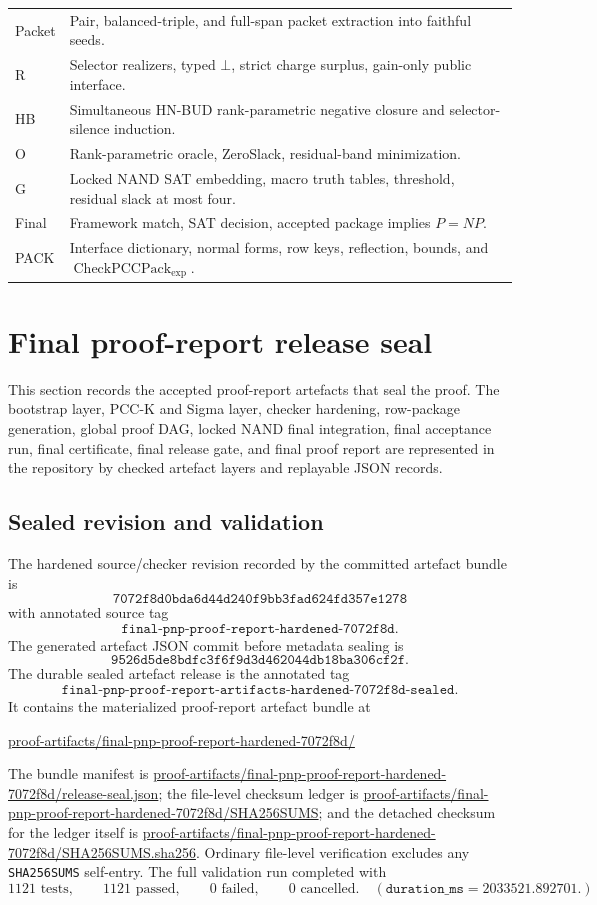 \documentclass[10.5pt,a4paper]{article}
\newcommand{\CheckPack}{\operatorname{CheckPCCPack}_{\exp}}
\newcommand{\Bot}{\bot}
\begin{document}
\begin{longtable}{>{\raggedright\arraybackslash}p{}p{}}
Packet & Pair, balanced-triple, and full-span packet extraction into faithful seeds.\\
R & Selector realizers, typed \(\Bot\), strict charge surplus, gain-only public interface.\\
HB & Simultaneous HN-BUD rank-parametric negative closure and selector-silence induction.\\
O & Rank-parametric oracle, ZeroSlack, residual-band minimization.\\
G & Locked NAND SAT embedding, macro truth tables, threshold, residual slack at most four.\\
Final & Framework match, SAT decision, accepted package implies \(P=NP\).\\
PACK & Interface dictionary, normal forms, row keys, reflection, bounds, and \(\CheckPack\).\\
\bottomrule
\end{longtable}


\section{Final proof-report release seal}\label{sec:final-proof-report}

This section records the accepted proof-report artefacts that seal the proof.  The bootstrap layer, PCC-K and Sigma layer, checker hardening, row-package generation, global proof DAG, locked NAND final integration, final acceptance run, final certificate, final release gate, and final proof report are represented in the repository by checked artefact layers and replayable JSON records.

\subsection{Sealed revision and validation}
The hardened source/checker revision recorded by the committed artefact bundle is
\[
\texttt{7072f8d0bda6d44d240f9bb3fad624fd357e1278}
\]
with annotated source tag
\[
\texttt{final-pnp-proof-report-hardened-7072f8d}.
\]
The generated artefact JSON commit before metadata sealing is
\[
\texttt{9526d5de8bdfc3f6f9d3d462044db18ba306cf2f}.
\]
The durable sealed artefact release is the annotated tag
\[
\texttt{final-pnp-proof-report-artifacts-hardened-7072f8d-sealed}.
\]
It contains the materialized proof-report artefact bundle at
\begin{center}
\url{proof-artifacts/final-pnp-proof-report-hardened-7072f8d/}
\end{center}
The bundle manifest is \url{proof-artifacts/final-pnp-proof-report-hardened-7072f8d/release-seal.json}; the file-level checksum ledger is \url{proof-artifacts/final-pnp-proof-report-hardened-7072f8d/SHA256SUMS}; and the detached checksum for the ledger itself is \url{proof-artifacts/final-pnp-proof-report-hardened-7072f8d/SHA256SUMS.sha256}.  Ordinary file-level verification excludes any \texttt{SHA256SUMS} self-entry.  The full validation run completed with
\[
1121\text{ tests},\qquad 1121\text{ passed},\qquad 0\text{ failed},\qquad 0\text{ cancelled}.\quad (\texttt{duration\_ms}=2033521.892701.)
\]
\end{document}
